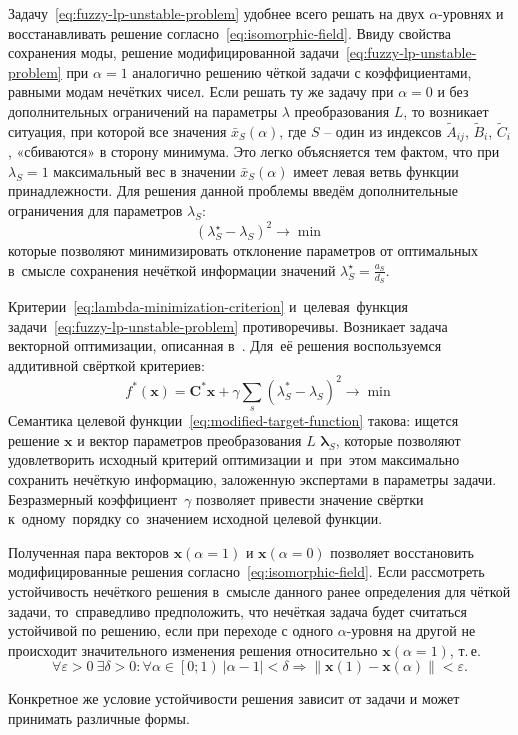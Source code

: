 Задачу~\eqref{eq:fuzzy-lp-unstable-problem} удобнее всего решать на двух $\alpha$-уровнях и восстанавливать решение согласно~\eqref{eq:isomorphic-field}. Ввиду свойства сохранения моды, решение модифицированной задачи~\eqref{eq:fuzzy-lp-unstable-problem} при $\alpha=1$ аналогично решению чёткой задачи с коэффициентами, равными модам нечётких чисел. Если решать ту же задачу при $\alpha=0$ и без дополнительных ограничений на параметры $\lambda$ преобразования $L$, то возникает ситуация, при которой все значения $\bar{x}_S\left(\alpha \right)$, где $S$ – один из индексов $\tilde A_{ij}$, $\tilde B_i$, $\tilde C_i$, «сбиваются» в сторону минимума. Это легко объясняется тем фактом, что при $\lambda_S=1$ максимальный вес в значении $\bar{x}_S\left(\alpha \right)$ имеет левая ветвь функции принадлежности. Для решения данной проблемы введём дополнительные ограничения для параметров $\lambda_S$:
\begin{equation}
\label{eq:lambda-minimization-criterion}
  {\left( \lambda_{S}^{\star}-\lambda_S \right)}^2\to \min
\end{equation}
которые позволяют минимизировать отклонение параметров от оптимальных в~смысле сохранения нечёткой информации значений $\displaystyle \lambda_{S}^{\star}=\frac{a_S}{d_S}$. 

Критерии~\eqref{eq:lambda-minimization-criterion} и~целевая~функция задачи~\eqref{eq:fuzzy-lp-unstable-problem} противоречивы. Возникает задача векторной оптимизации, описанная в~\cite{MSU_Optimization}. Для~её решения воспользуемся аддитивной свёрткой критериев:
\begin{equation}
\label{eq:modified-target-function}
  f^{*}\left( \mathbf{x} \right)=\mathbf{C}^{*}\mathbf{x}+\gamma \sum\limits_{s}^{}{\left(\lambda_{S}^{*}-\lambda_S \right)}^{2} \to \min
\end{equation}
Семантика целевой функции~\eqref{eq:modified-target-function} такова: ищется решение $\mathbf{x}$ и вектор параметров преобразования $L$ $\mathbf{\lambda}_S$, которые позволяют удовлетворить исходный критерий оптимизации и~при~этом максимально сохранить нечёткую информацию, заложенную экспертами в параметры задачи. Безразмерный коэффициент~$\gamma$ позволяет привести значение свёртки к~одному~порядку со~значением исходной целевой функции.

Полученная пара векторов $\mathbf{x}\left( \alpha =1 \right)$ и $\mathbf{x}\left( \alpha =0 \right)$ позволяет восстановить модифицированные решения согласно~\eqref{eq:isomorphic-field}. Если рассмотреть устойчивость нечёткого решения в~смысле данного ранее определения для чёткой задачи, то~справедливо предположить, что нечёткая задача будет считаться устойчивой по решению, если при переходе с одного $\alpha$-уровня на другой не происходит значительного изменения решения относительно $\mathbf{x}\left( \alpha =1 \right)$, т.\,е.
\begin{equation*}
  \forall \varepsilon >0\ \exists \delta >0:\forall \alpha \in \left[0; 1\right)\ \left| \alpha -1 \right|<\delta \Rightarrow \left\| \mathbf{x}\left( 1 \right)-\mathbf{x}\left( \alpha  \right) \right\|<\varepsilon.
\end{equation*}

Конкретное же условие устойчивости решения зависит от задачи и может принимать различные формы.